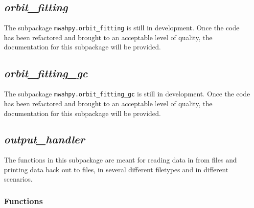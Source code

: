\documentclass{article}
\begin{document}
\subsection{\textit{orbit\_fitting}}

The subpackage \verb!mwahpy.orbit_fitting! is still in development. Once the code has been refactored and brought to an acceptable level of quality, the documentation for this subpackage will be provided. 

\subsection{\textit{orbit\_fitting\_gc}}

The subpackage \verb!mwahpy.orbit_fitting_gc! is still in development. Once the code has been refactored and brought to an acceptable level of quality, the documentation for this subpackage will be provided.  

\subsection{\textit{output\_handler}}

The functions in this subpackage are meant for reading data in from files and printing data back out to files, in several different filetypes and in different scenarios.

\subsubsection{Functions}
\end{document}
